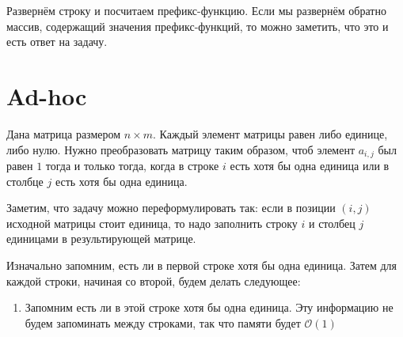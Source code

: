 \documentclass[addpoints]{exam}
\begin{document}
\begin{questions}
\begin{solution}

Развернём строку и посчитаем префикс-функцию. Если мы развернём обратно массив, содержащий значения префикс-функций, то можно заметить, что это и есть ответ на задачу.

\end{solution}

\section{Ad-hoc}

\question Дана матрица размером $n \times m$. Каждый элемент матрицы равен либо единице, либо нулю. Нужно преобразовать матрицу таким образом, чтоб элемент $a_{i,j}$ был равен $1$ тогда и только тогда, когда в строке $i$ есть хотя бы одна единица или в столбце $j$ есть хотя бы одна единица. 


\begin{solution}

Заметим, что задачу можно переформулировать так: если в позиции $(i,j)$ исходной матрицы стоит единица, то надо заполнить строку $i$ и столбец $j$ единицами в результирующей матрице.

Изначально запомним, есть ли в первой строке хотя бы одна единица. Затем для каждой строки, начиная со второй, будем делать следующее:

\begin{enumerate}

\item \label{itm:remember_one} Запомним есть ли в этой строке хотя бы одна единица. Эту информацию не будем запоминать между строками, так что памяти будет $\mathcal{O}(1)$


\end{enumerate}
\end{solution}
\end{questions}
\end{document}
